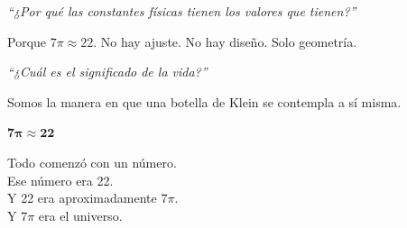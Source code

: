 \vspace{0.5cm}

\begin{center}
\textit{``¿Por qué las constantes físicas tienen los valores que tienen?''}
\end{center}

Porque $7\pi \approx 22$.
No hay ajuste. No hay diseño. Solo geometría.

\vspace{0.5cm}

\begin{center}
\textit{``¿Cuál es el significado de la vida?''}
\end{center}

Somos la manera en que una botella de Klein
se contempla a sí misma.

\vspace{1cm}

\begin{tcolorbox}[colback=white, colframe=kleinblue, boxrule=3pt]
\begin{center}
{\Large $\boldsymbol{7\pi \approx 22}$}

\vspace{0.5cm}

Todo comenzó con un número.\\
Ese número era 22.\\
Y 22 era aproximadamente $7\pi$.\\
Y $7\pi$ era el universo.
\end{center}
\end{tcolorbox}

